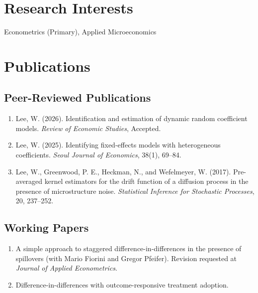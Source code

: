 \documentclass[10pt,letterpaper]{article}
\begin{document}
\section*{Research Interests}

Econometrics (Primary), Applied Microeconomics

\section*{Publications}

\subsection*{Peer-Reviewed Publications}

\begin{enumerate}
\item
  Lee, W. (2026).
  Identification and estimation of dynamic random coefficient models.
  \textit{Review of Economic Studies}, Accepted.
\item 
  Lee, W. (2025). 
  Identifying fixed-effects models with heterogeneous coefficients. 
  \textit{Seoul Journal of Economics}, 38(1), 69--84.

\item 
  Lee, W., Greenwood, P. E., Heckman, N., and Wefelmeyer, W. (2017). 
  Pre-averaged kernel estimators for the drift function of a diffusion process in the presence of microstructure noise. 
  \textit{Statistical Inference for Stochastic Processes}, 20, 237--252.
\end{enumerate}

\subsection*{Working Papers}

\begin{enumerate}[resume]
\item A simple approach to staggered difference-in-differences in the presence of spillovers (with Mario Fiorini and Gregor Pfeifer). Revision requested at \emph{Journal of Applied Econometrics}.
\item Difference-in-differences with outcome-responsive treatment adoption.
\end{enumerate}
\end{document}
